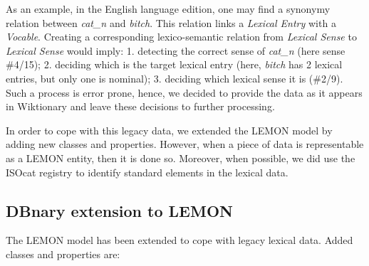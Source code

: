 \documentclass[sw]{iosart2c}
\begin{document}
As an example, in the English language edition, one may find a synonymy relation between \textit{cat\_n} and \textit{bitch}. This relation links a \textit{Lexical Entry} with a \textit{Vocable}. Creating a corresponding lexico-semantic relation from \textit{Lexical Sense} to \textit{Lexical Sense} would imply: 1. detecting the correct sense of \textit{cat\_n} (here sense \#4/15); 2. deciding which is the target lexical entry (here, \textit{bitch} has 2 lexical entries, but only one is nominal); 3. deciding which lexical sense it is (\#2/9). Such a process is error prone, hence, we decided to provide the data as it appears in Wiktionary and leave these decisions to further processing.

In order to cope with this legacy data, we extended the LEMON model by adding new classes and properties. However, when a piece of data is representable as a LEMON entity, then it is done so. Moreover, when possible, we did use the ISOcat registry \cite{windhouwer2012linking} to identify standard elements in the lexical data.

\subsection{DBnary extension to LEMON}

The LEMON model has been extended to cope with legacy lexical data. Added classes and properties are:
\end{document}
